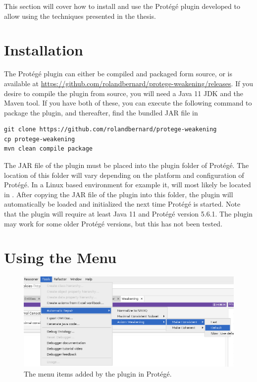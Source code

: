 
This section will cover how to install and use the Protégé plugin developed to allow using the techniques presented in the thesis.

\section{Installation}

The Protégé plugin can either be compiled and packaged form source, or is available at \url{https://github.com/rolandbernard/protege-weakening/releases}. If you desire to compile the plugin from source, you will need a Java 11 JDK and the Maven tool. If you have both of these, you can execute the following command to package the plugin, and thereafter, find the bundled JAR file in 

\begin{lstlisting}
git clone https://github.com/rolandbernard/protege-weakening
cp protege-weakening
mvn clean compile package
\end{lstlisting}

The JAR file of the plugin must be placed into the plugin folder of Protégé. The location of this folder will vary depending on the platform and configuration of Protégé. In a Linux based environment for example it, will most likely be located in . After copying the JAR file of the plugin into this folder, the plugin will automatically be loaded and initialized the next time Protégé is started. Note that the plugin will require at least Java 11 and Protégé version 5.6.1. The plugin may work for some older Protégé versions, but this has not been tested.

\section{Using the Menu}

\begin{figure}[htbp]
  \centering
  \includegraphics[width=\textwidth]{resources/protege-guide-menu.png}
  \caption{The menu items added by the plugin in Protégé.}
\end{figure}

